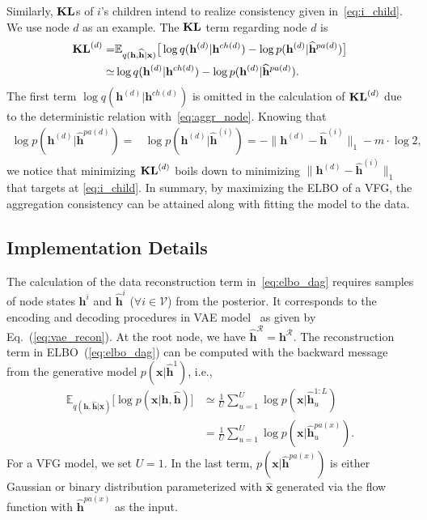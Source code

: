 \documentclass[sigconf, anonymous, review]{acmart}
\theoremstyle{plain}
\theoremstyle{definition}
\theoremstyle{remark}
\begin{document}
Similarly,  $\textbf{\text{KL}}$s  of $i$'s children intend to realize consistency given in~\eqref{eq:i_child}. We use node $d$ as an example.  The $\textbf{\text{KL}}$ term regarding node $d$ is 
\begin{align*}%
\textbf{\text{KL}}^{(d)} = & \mathbb{E}_{q(\mathbf{h}, \widehat{\mathbf{h}}|\mathbf{x})}\big[  \log q(\mathbf{h}^{(d)}|\mathbf{h}^{ch(d)})  - \log p(\mathbf{h}^{(d)}|\widehat{\mathbf{h}}^{pa(d)}) \big] \\
\simeq & \log q(\mathbf{h}^{(d)}|\mathbf{h}^{ch(d)})  - \log p(\mathbf{h}^{(d)}|\widehat{\mathbf{h}}^{pa(d)}).
\end{align*} 
The first term $\log q(\mathbf{h}^{(d)}|\mathbf{h}^{ch(d)})$ is omitted in the calculation of  $\textbf{\text{KL}}^{(d)}$ due to the deterministic relation with~\eqref{eq:aggr_node}. Knowing that
\begin{align*}%
 \log p(\mathbf{h}^{(d)}|\widehat{\mathbf{h}}^{pa(d)})= & \log p(\mathbf{h}^{(d)}|\widehat{\mathbf{h}}^{(i)})
 =  -\|\mathbf{h}^{(d)}- \widehat{\mathbf{h}}^{(i)}\|_1 - m\cdot\log2,
\end{align*} %
we notice that minimizing $\textbf{\text{KL}}^{(d)}$ boils down to minimizing $\|\mathbf{h}^{(d)}- \widehat{\mathbf{h}}^{(i)}\|_1$ that targets at \eqref{eq:i_child}. 
In summary, by maximizing the ELBO of a VFG, the aggregation consistency can be  attained along with fitting the model to the data. 

\subsection{Implementation Details}

The calculation of the data reconstruction term in~\eqref{eq:elbo_dag} requires  samples of node states $\mathbf{h}^{i}$ and $\widehat{\mathbf{h}}^{i}$ ($\forall i \in \mathcal{V}$) from the posterior. It corresponds to the encoding and decoding procedures in VAE model~\cite{kingma2013auto,rezende2014stochastic} as given by Eq.~(\ref{eq:vae_recon}). At the root node,  we have $\widehat{\mathbf{h}}^{\mathcal{R}}=\mathbf{h}^{\mathcal{R}} $.  The reconstruction term in ELBO~(\ref{eq:elbo_dag}) can be computed with the backward message from the generative model $p(\mathbf{x}| \widehat{\mathbf{h}}^{1})$, i.e.,
\begin{align*} 
\mathbb{E}_{q(\mathbf{h}, \widehat{\mathbf{h}}|\mathbf{x})}\big[ \log p(\mathbf{x}|\mathbf{h}, \widehat{\mathbf{h}})\big]
&\simeq \frac{1}{U}\sum_{u=1}^U \log p(\mathbf{x}| \widehat{\mathbf{h}}^{1:L}_u) \\
&= \frac{1}{U}\sum_{u=1}^U \log p(\mathbf{x}| \widehat{\mathbf{h}}^{pa(x)}_u) .
 \end{align*}
For a VFG model, we set $U=1$. In the last term,  $p(\mathbf{x}| \widehat{\mathbf{h}}^{pa(x)})$ is either Gaussian or binary distribution parameterized with $\widehat{\mathbf{x}}$ generated via the flow function with $\widehat{\mathbf{h}}^{pa(x)}$ as the input. 
\end{document}
